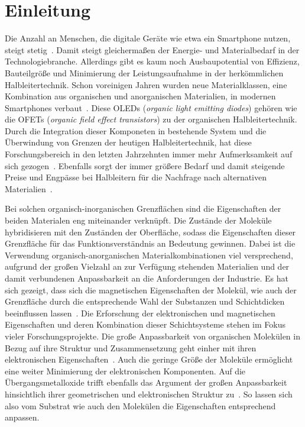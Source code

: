 \chapter{Einleitung}
    Die Anzahl an Menschen, die digitale Geräte wie etwa ein Smartphone nutzen, steigt stetig~\cite{Statista}.
    Damit steigt gleichermaßen der Energie- und Materialbedarf in der Technologiebranche.
    Allerdings gibt es kaum noch Ausbaupotential von Effizienz, Bauteilgröße und Minimierung der Leistungsaufnahme in der herkömmlichen Halbleitertechnik.
    Schon voreinigen Jahren wurden neue Materialklassen, eine Kombination aus organischen und anorganischen Materialien, in modernen Smartphones verbaut~\cite{MAC}.
    Diese OLEDs (\textit{organic light emitting diodes}) gehören wie die OFETs (\textit{organic field effect transistors}) zu der organischen Halbleitertechnik.
    Durch die Integration dieser Komponeten in bestehende System und die Überwindung von Grenzen der heutigen Halbleitertechnik, hat diese Forschungsbereich in den letzten Jahrzehnten immer mehr Aufmerksamkeit auf sich gezogen~\cite{Uni-Tübingen}.
    Ebenfalls sorgt der immer größere Bedarf und damit steigende Preise und Engpässe bei Halbleitern für die Nachfrage nach alternativen Materialien~\cite{Idealo}.

    Bei solchen organisch-inorganischen Grenzflächen sind die Eigenschaften der beiden Materialen eng miteinander verknüpft.
    Die Zustände der Moleküle hybridisieren mit den Zuständen der Oberfläche, sodass die Eigenschaften dieser Grenzfläche für das Funktionsverständnis an Bedeutung gewinnen.
    Dabei ist die Verwendung organisch-anorganischen Materialkombinationen viel versprechend, aufgrund der großen Vielzahl an zur Verfügung stehenden Materialien und der damit verbundenen Anpassbarkeit an die Anforderungen der Industrie.
    Es hat sich gezeigt, dass sich die magnetischen Eigenschaften der Molekül, wie auch der Grenzfläche durch die entsprechende Wahl der Substanzen und Schichtdicken beeinflussen lassen~\cite{IF_16}.
    Die Erforschung der elektronischen und magnetischen Eigenschaften und deren Kombination dieser Schichtsysteme stehen im Fokus vieler Forschungsprojekte.
    Die große Anpassbarkeit von organischen Molekülen in Bezug auf ihre Struktur und Zusammensetzung geht einher mit ihren elektronischen Eigenschaften~\cite{scholl_chapter_2018}.
    Auch die geringe Größe der Moleküle ermöglicht eine weiter Minimierung der elektronischen Komponenten.
    Auf die Übergangsmetalloxide trifft ebenfalls das Argument der großen Anpassbarkeit hinsichtlich ihrer geometrischen und elektronischen Struktur zu~\cite{5A_4}.
    So lassen sich also vom Substrat wie auch den Molekülen die Eigenschaften entsprechend anpassen. %

